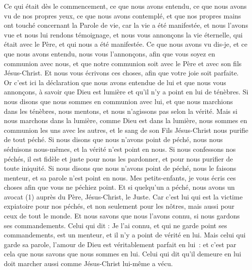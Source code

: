\BFont
\begin{multicols}{2}
\VerseOne{}Ce qui était dès le commencement, ce que nous avons entendu, ce que nous avons vu de nos propres yeux, ce que nous avons contemplé, et que nos propres mains ont touché concernant la Parole de vie,
car la vie a été manifestée, et nous l'avons vue et nous lui rendons témoignage, et nous vous annonçons la vie éternelle, qui était avec le Père, et qui nous a été manifestée.
Ce que nous avons vu dis-je, et ce que nous avons entendu, nous vous l'annonçons, afin que vous soyez en communion avec nous, et que notre communion soit avec le Père et avec son fils Jésus-Christ.
Et nous vous écrivons ces choses, afin que votre joie soit parfaite.
Or c'est ici la déclaration que nous avons entendue de lui et que nous vous annonçons, à savoir que Dieu est lumière et qu'il n'y a point en lui de ténèbres.
Si nous disons que nous sommes en communion avec lui, et que nous marchions dans les ténèbres, nous mentons, et nous n'agissons pas selon la vérité.
Mais si nous marchons dans la lumière, comme Dieu est dans la lumière, nous sommes en communion les uns avec les autres, et le sang de son Fils Jésus-Christ nous purifie de tout péché.
Si nous disons que nous n'avons point de péché, nous nous séduisons nous-mêmes, et la vérité n'est point en nous.
Si nous confessons nos péchés, il est fidèle et juste pour nous les pardonner, et pour nous purifier de toute iniquité.
Si nous disons que nous n'avons point de péché, nous le faisons menteur, et sa parole n'est point en nous.
\VerseOne{}Mes petits-enfants, je vous écris ces choses afin que vous ne péchiez point. Et si quelqu'un a péché, nous avons un avocat (1) auprès du Père, Jésus-Christ, le Juste.
Car c'est lui qui est la victime expiatoire pour nos péchés, et non seulement pour les nôtres, mais aussi pour ceux de tout le monde.
Et nous savons que nous l'avons connu, si nous gardons ses commandements.
Celui qui dit : Je l'ai connu, et qui ne garde point ses commandements, est un menteur, et il n'y a point de vérité en lui.
Mais celui qui garde sa parole, l'amour de Dieu est véritablement parfait en lui : et c'est par cela que nous savons que nous sommes en lui.
Celui qui dit qu'il demeure en lui doit marcher aussi comme Jésus-Christ lui-même a vécu.

\end{multicols}
